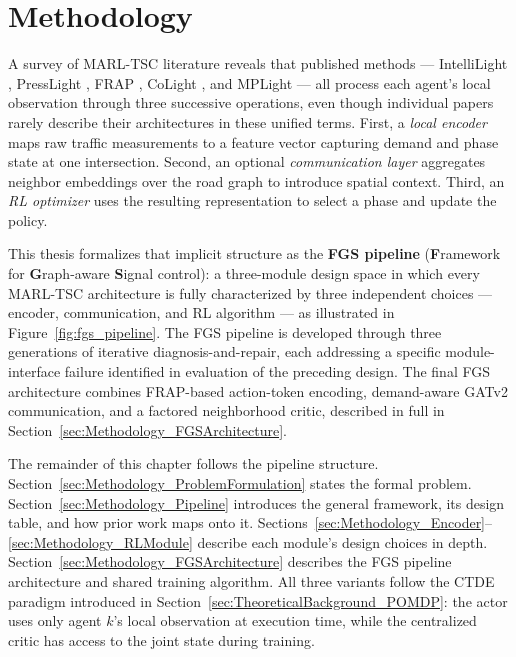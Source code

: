 \chapter{Methodology}
\label{ch:Methodology}

A survey of MARL-TSC literature reveals that published methods — IntelliLight \citep{wei2018intellilight}, PressLight \citep{wei2019presslight}, FRAP \citep{zheng2019learning}, CoLight \citep{wei2019colight}, and MPLight \citep{chen2020toward} — all process each agent's local observation through three successive operations, even though individual papers rarely describe their architectures in these unified terms. First, a \emph{local encoder} maps raw traffic measurements to a feature vector capturing demand and phase state at one intersection. Second, an optional \emph{communication layer} aggregates neighbor embeddings over the road graph to introduce spatial context. Third, an \emph{RL optimizer} uses the resulting representation to select a phase and update the policy.

This thesis formalizes that implicit structure as the \textbf{FGS pipeline} (\textbf{F}ramework for \textbf{G}raph-aware \textbf{S}ignal control): a three-module design space in which every MARL-TSC architecture is fully characterized by three independent choices — encoder, communication, and RL algorithm — as illustrated in Figure~\ref{fig:fgs_pipeline}. The FGS pipeline is developed through three generations of iterative diagnosis-and-repair, each addressing a specific module-interface failure identified in evaluation of the preceding design. The final FGS architecture combines FRAP-based action-token encoding, demand-aware GATv2 communication, and a factored neighborhood critic, described in full in Section~\ref{sec:Methodology_FGSArchitecture}.

The remainder of this chapter follows the pipeline structure. Section~\ref{sec:Methodology_ProblemFormulation} states the formal problem. Section~\ref{sec:Methodology_Pipeline} introduces the general framework, its design table, and how prior work maps onto it. Sections~\ref{sec:Methodology_Encoder}--\ref{sec:Methodology_RLModule} describe each module's design choices in depth. Section~\ref{sec:Methodology_FGSArchitecture} describes the FGS pipeline architecture and shared training algorithm. All three variants follow the CTDE paradigm introduced in Section~\ref{sec:TheoreticalBackground_POMDP}: the actor uses only agent $k$'s local observation at execution time, while the centralized critic has access to the joint state during training.

